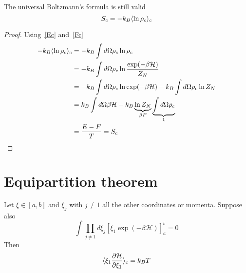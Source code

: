     The universal Boltzmann's formula is still valid
    \begin{equation*}
        S_c = -k_B \langle\ln \rho_c\rangle_{c} 
    \end{equation*}


    \begin{proof}
        Using~\eqref{Ec} and~\eqref{Fc}
        \begin{equation*}
            \begin{aligned}
            -k_B \langle\ln \rho_c\rangle_{c} & = -k_B \int d\Omega \rho_c \ln \rho_c \\ & = -k_B \int d\Omega \rho_c \ln \frac{\exp(-\beta \mathcal H)}{Z_N} \\ & = -k_B \int d\Omega \rho_c \ln \exp(-\beta \mathcal H) - k_B \int d\Omega \rho_c \ln Z_N \\ & = k_B \int d\Omega \beta \mathcal H - k_B \underbrace{\ln Z_N}_{\beta F} \underbrace{\int d\Omega \rho_c}_{1} \\ & =  \frac{E - F}{T} = S_c
        \end{aligned}
        \end{equation*}
    \end{proof}

\section{Equipartition theorem}

    \begin{theorem}
        Let $\xi \in [a,b]$ and $\xi_j$ with $j \neq 1$ all the other coordinates or momenta. Suppose also 
        \begin{equation}\label{cond}
            \int \prod_{j \neq 1} d \xi_j [\xi_1 \exp(-\beta \mathcal H)]_a^b = 0
        \end{equation}
        Then 
        \begin{equation*}
            \langle\xi_1 \frac{\partial\mathcal H}{\partial\xi_1}\rangle_{c} = k_B T
        \end{equation*}
    \end{theorem}

